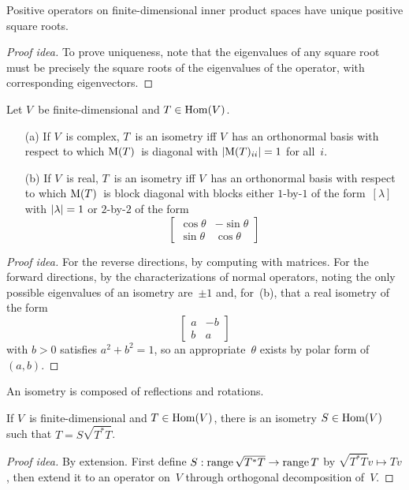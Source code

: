 \begin{cor}
Positive operators on finite-dimensional inner product spaces have unique positive square roots.
\end{cor}
\begin{proof}[Proof idea]
To prove uniqueness, note that the eigenvalues of any square root must be precisely the square roots of the eigenvalues of the operator, with corresponding eigenvectors.
\end{proof}

\begin{thm}
Let \(V\)~be finite-dimensional and \(T\in\operatorname{Hom}(V)\).
\begin{enumerate}[itemsep=0pt]
\item[(a)] If \(V\)~is complex, \(T\)~is an isometry iff \(V\)~has an orthonormal basis with respect to which \(\operatorname{M}(T)\)~is diagonal with \(|{\operatorname{M}(T)_{ii}}|=1\) for all~\(i\).
\item[(b)] If \(V\)~is real, \(T\)~is an isometry iff \(V\)~has an orthonormal basis with respect to which \(\operatorname{M}(T)\)~is block diagonal with blocks either \(1\)-by-\(1\) of the form~\([\lambda]\) with \(|{\lambda}|=1\) or \(2\)-by-\(2\) of the form
\[\left[\begin{matrix}
\cos\theta&-\sin\theta\\
\sin\theta&\cos\theta
\end{matrix}\right]\]
\end{enumerate}
\end{thm}
\begin{proof}[Proof idea]
For the reverse directions, by computing with matrices. For the forward directions, by the characterizations of normal operators, noting the only possible eigenvalues of an isometry are~\(\pm1\) and, for~(b), that a real isometry of the form
\[\left[\begin{matrix}
a&-b\\
b&a
\end{matrix}\right]\]
with \(b>0\) satisfies \(a^2+b^2=1\), so an appropriate~\(\theta\) exists by polar form of~\((a,b)\).
\end{proof}

\begin{rmk}
An isometry is composed of reflections and rotations.
\end{rmk}

\begin{thm}
If \(V\)~is finite-dimensional and \(T\in\operatorname{Hom}(V)\), there is an isometry \(S\in\operatorname{Hom}(V)\) such that \(T=S\sqrt{T^*T}\).
\end{thm}
\begin{proof}[Proof idea]
By extension. First define \(S:\operatorname{range}\sqrt{T^*T}\to\operatorname{range} T\) by \(\sqrt{T^*T}v\mapsto Tv\), then extend it to an operator on~\(V\) through orthogonal decomposition of~\(V\).
\end{proof}

